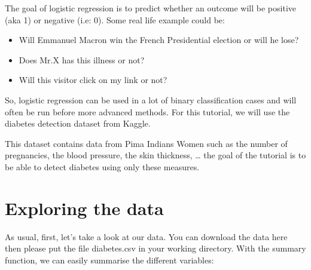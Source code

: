 \documentclass[]{book}
\providecommand{\tightlist}{%
  \setlength{\itemsep}{0pt}\setlength{\parskip}{0pt}}
\begin{document}
The goal of logistic regression is to predict whether an outcome will be positive (aka 1) or negative (i.e: 0). Some real life example could be:

\begin{itemize}
\tightlist
\item
  Will Emmanuel Macron win the French Presidential election or will he lose?
\item
  Does Mr.X has this illness or not?
\item
  Will this visitor click on my link or not?
\end{itemize}

So, logistic regression can be used in a lot of binary classification cases and will often be run before more advanced methods. For this tutorial, we will use the diabetes detection dataset from Kaggle.

This dataset contains data from Pima Indians Women such as the number of pregnancies, the blood pressure, the skin thickness, \ldots{} the goal of the tutorial is to be able to detect diabetes using only these measures.

\hypertarget{exploring-the-data}{%
\section{Exploring the data}\label{exploring-the-data}}

As usual, first, let's take a look at our data. You can download the data here then please put the file diabetes.csv in your working directory. With the summary function, we can easily summarise the different variables:
\end{document}
